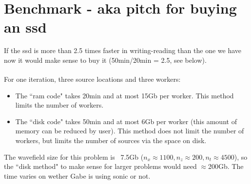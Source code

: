 \documentclass[a4paper,12pt]{article}
\begin{document}
\section*{Benchmark - aka pitch for buying an ssd}
If the ssd is more than 2.5 times faster in writing-reading than the one we have now it would make sense to buy it (50min/20min = 2.5, see below).
\\\\
For one iteration, three source locations and three workers: 
\begin{itemize}
\item The ``ram code" takes 20min and at most 15Gb per worker. This method limits the number of workers.
\item The ``disk code" takes 50min and at most 6Gb per worker (this amount of memory can be reduced by user). This method does not limit the number of workers, but limits the number of sources via the space on disk.
\end{itemize}
The wavefield size for this problem is ~7.5Gb ($n_x\approx1100,n_z\approx200,n_t\approx4500$), so the ``disk method" to make sense for larger problems would need $\approx$200Gb. The time varies on wether Gabe is using sonic or not. 
\end{document}
